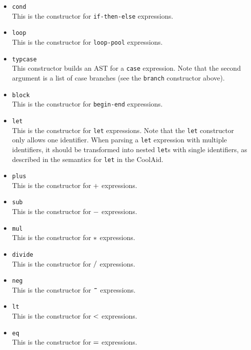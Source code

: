 \begin{itemize}
\item {\tt cond} \\
This is the constructor for {\tt if-then-else} expressions.

\item {\tt loop}\\
This is the constructor for {\tt loop-pool} expressions.

\item {\tt typcase}\\
This constructor builds an AST for a {\tt case} expression.  Note that the
second argument is a list of case branches (see the {\tt branch} constructor
above).

\item{\tt block} \\
This is the constructor for {\tt begin-end} expressions.

\item {\tt let}\\
This is the constructor for {\tt let} expressions. Note that the
{\tt let} constructor only allows one identifier.  When parsing a {\tt let}
expression with multiple identifiers, it should be transformed  into
nested {\tt let}s with single identifiers, as described in the semantics
for {\tt let} in the CoolAid.

\item {\tt plus}\\
This is the constructor for $\tt +$ expressions.

\item {\tt sub}\\
This is the constructor for $\tt -$ expressions.

\item {\tt mul}\\
This is the constructor for $\tt \ast$ expressions.


\item {\tt divide}\\
This is the constructor for $\tt /$ expressions.

\item {\tt neg}\\
This is the constructor for $\tt \;\tilde{ }\;$ expressions.

\item {\tt lt}\\
This is the constructor for $\tt <$ expressions.

\item {\tt eq}\\
This is the constructor for $\tt =$ expressions.


\end{itemize}
